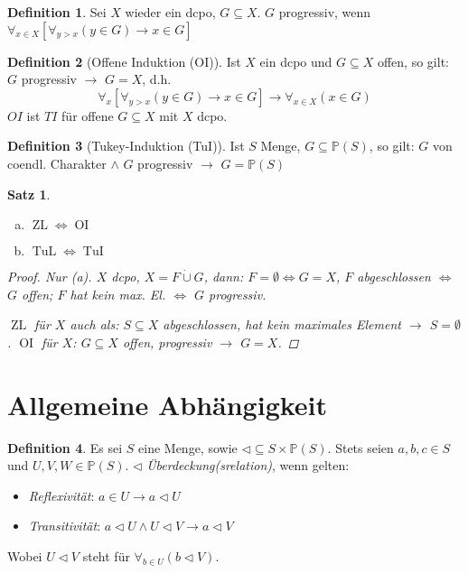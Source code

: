 \documentclass[headsepline=true,DIV=11]{scrartcl}
\newtheorem*{theorem}{Satz}
\theoremstyle{definition}
\newtheorem*{definition}{Definition}
\newcommand{\ZL}{\operatorname{ZL}}
\newcommand{\OI}{\operatorname{OI}}
\newcommand{\TuL}{\operatorname{TuL}}
\newcommand{\TuI}{\operatorname{TuI}}
\begin{document}
\begin{definition}
	Sei $X$ wieder ein dcpo, $G\subseteq X$.
	$G$ progressiv, wenn $\forall_{x\in X} [\forall_{y>x}(y\in G)\to x\in G]$
\end{definition}

\begin{definition}[Offene Induktion (OI)]
	Ist $X$ ein dcpo und $G\subseteq X$ offen, so gilt: $G$ progressiv $\to$ $G=X$, d.h.
	\[\forall_x[\forall_{y>x}(y\in G)\to x\in G]\to \forall_{x\in X}(x\in G)\]
	$OI$ ist $TI$ für offene $G\subseteq X$ mit $X$ dcpo.
\end{definition}

\begin{definition}[Tukey-Induktion (TuI)]
	Ist $S$ Menge, $G\subseteq\mathbb P(S)$, so gilt:
	$G$ von coendl. Charakter $\land$ $G$ progressiv $\to$ $G=\mathbb P(S)$
\end{definition}

\begin{theorem}
	\begin{enumerate}[(a)]
		\item $\ZL \iff \OI$
		\item $\TuL \iff \TuI$
	\end{enumerate}
	\begin{proof}
		Nur (a).
		$X$ dcpo, $X=F\dot\cup G$, dann: $F=\emptyset\iff G=X$, 
		$F$ abgeschlossen $\iff$ $G$ offen;
		$F$ hat kein max. El. $\iff$ $G$ progressiv.
		
		$\ZL$ für $X$ auch als: $S\subseteq X$ abgeschlossen, hat kein maximales Element $\to$ $S=\emptyset$.
		$\OI$ für $X$: $G\subseteq X$ offen, progressiv $\to$ $G=X$.
	\end{proof}
\end{theorem}

\section*{Allgemeine Abhängigkeit}

\begin{definition}
	Es sei $S$ eine Menge, sowie $\lhd\subseteq S\times \mathbb P(S)$.
	Stets seien $a, b, c\in S$ und $U, V, W\in \mathbb P(S)$.
	$\lhd$ {\em Überdeckung(srelation)}, wenn gelten:
	\begin{itemize}
		\item {\em Reflexivität}: $a\in U\to a\lhd U$
		\item {\em Transitivität}: $ a\lhd U \land U\lhd V \to a\lhd V$
	\end{itemize}
	Wobei $U\lhd V$ steht für $\forall_{b\in U}(b\lhd V)$. %
	
\end{definition}
\end{document}
